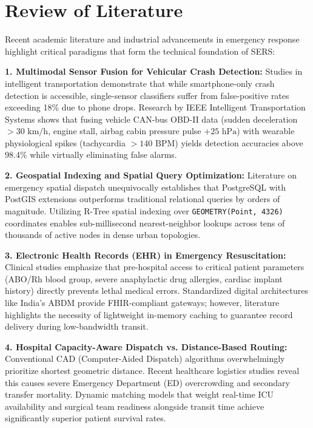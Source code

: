 \documentclass[12pt,a4paper]{article}
\begin{document}
\clearpage
\section{Review of Literature}
Recent academic literature and industrial advancements in emergency response highlight critical paradigms that form the technical foundation of SERS:

\textbf{1. Multimodal Sensor Fusion for Vehicular Crash Detection:} 
Studies in intelligent transportation demonstrate that while smartphone-only crash detection is accessible, single-sensor classifiers suffer from false-positive rates exceeding 18\% due to phone drops. Research by IEEE Intelligent Transportation Systems shows that fusing vehicle CAN-bus OBD-II data (sudden deceleration $>30\text{ km/h}$, engine stall, airbag cabin pressure pulse $+25\text{ hPa}$) with wearable physiological spikes (tachycardia $>140\text{ BPM}$) yields detection accuracies above 98.4\% while virtually eliminating false alarms.

\textbf{2. Geospatial Indexing and Spatial Query Optimization:} 
Literature on emergency spatial dispatch unequivocally establishes that PostgreSQL with PostGIS extensions outperforms traditional relational queries by orders of magnitude. Utilizing R-Tree spatial indexing over \texttt{GEOMETRY(Point, 4326)} coordinates enables sub-millisecond nearest-neighbor lookups across tens of thousands of active nodes in dense urban topologies.

\textbf{3. Electronic Health Records (EHR) in Emergency Resuscitation:} 
Clinical studies emphasize that pre-hospital access to critical patient parameters (ABO/Rh blood group, severe anaphylactic drug allergies, cardiac implant history) directly prevents lethal medical errors. Standardized digital architectures like India's ABDM provide FHIR-compliant gateways; however, literature highlights the necessity of lightweight in-memory caching to guarantee record delivery during low-bandwidth transit.

\textbf{4. Hospital Capacity-Aware Dispatch vs. Distance-Based Routing:} 
Conventional CAD (Computer-Aided Dispatch) algorithms overwhelmingly prioritize shortest geometric distance. Recent healthcare logistics studies reveal this causes severe Emergency Department (ED) overcrowding and secondary transfer mortality. Dynamic matching models that weight real-time ICU availability and surgical team readiness alongside transit time achieve significantly superior patient survival rates.
\end{document}

